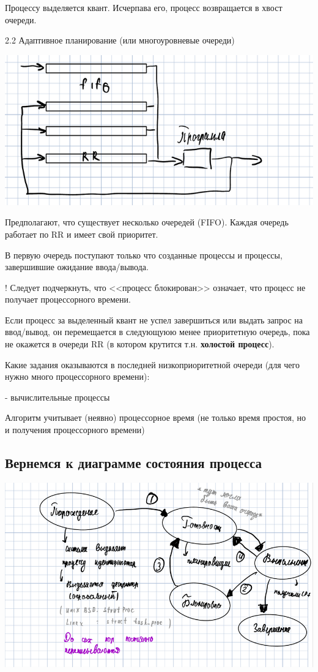 \documentclass[14pt, a4paper]{article}
\begin{document}
	Процессу выделяется квант. Исчерпава его, процесс возвращается в хвост очереди.
	
	2.2 Адаптивное планирование (или многоуровневые очереди)
	
	\includegraphics[width=\linewidth]{3}
	
	Предполагают, что существует несколько очередей (FIFO). Каждая очередь работает по RR и имеет свой приоритет.
	
	В первую очередь поступают только что созданные процессы и процессы, завершившие ожидание ввода/вывода.
	
	! Следует подчеркнуть, что <<процесс блокирован>> означает, что процесс не получает процессорного времени.
	
	Если процесс за выделенный квант не успел завершиться или выдать запрос на ввод/вывод, он перемещается в следующуюю менее приоритетную очередь, пока не окажется в очереди RR (в котором крутится т.н. {\bf холостой процесс}).
	
	Какие задания оказываются в последней низкоприоритетной очереди (для чего нужно много процессорного времени):
	
	- вычислительные процессы
	
	Алгоритм учитывает (неявно) процессорное время (не только время простоя, но и получения процессорного времени)
	
	\subsection{Вернемся к диаграмме состояния процесса}
	
	\includegraphics[width=\linewidth]{4}
	
\end{document}
